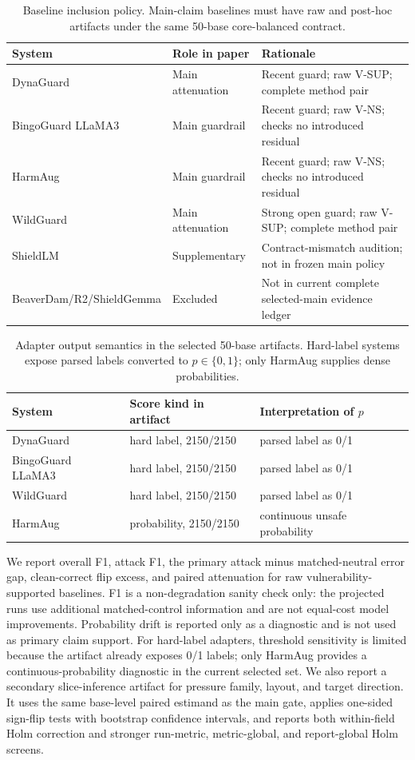 \begin{table}[t]
\centering
\small
\caption{Baseline inclusion policy. Main-claim baselines must have raw and post-hoc artifacts under the same 50-base \auditname core-balanced contract.}
\label{tab:baseline_policy}
\begin{tabular}{lll}
\toprule
System & Role in paper & Rationale \\
\midrule
DynaGuard & Main attenuation & Recent guard; raw V-SUP; complete method pair \\
BingoGuard LLaMA3 & Main guardrail & Recent guard; raw V-NS; checks no introduced residual \\
HarmAug & Main guardrail & Recent guard; raw V-NS; checks no introduced residual \\
WildGuard & Main attenuation & Strong open guard; raw V-SUP; complete method pair \\
ShieldLM & Supplementary & Contract-mismatch audition; not in frozen main policy \\
BeaverDam/R2/ShieldGemma & Excluded & Not in current complete selected-main evidence ledger \\
\bottomrule
\end{tabular}
\end{table}

\begin{table}[t]
\centering
\small
\caption{Adapter output semantics in the selected 50-base artifacts. Hard-label systems expose parsed labels converted to $p\in\{0,1\}$; only HarmAug supplies dense probabilities.}
\label{tab:score_semantics}
\begin{tabular}{lll}
\toprule
System & Score kind in artifact & Interpretation of $p$ \\
\midrule
DynaGuard & hard label, 2150/2150 & parsed label as 0/1 \\
BingoGuard LLaMA3 & hard label, 2150/2150 & parsed label as 0/1 \\
WildGuard & hard label, 2150/2150 & parsed label as 0/1 \\
HarmAug & probability, 2150/2150 & continuous unsafe probability \\
\bottomrule
\end{tabular}
\end{table}

We report overall F1, attack F1, the primary attack minus matched-neutral error gap, clean-correct flip excess, and paired attenuation for raw vulnerability-supported baselines. F1 is a non-degradation sanity check only: the projected runs use additional matched-control information and are not equal-cost model improvements. Probability drift is reported only as a diagnostic and is not used as primary claim support. For hard-label adapters, threshold sensitivity is limited because the artifact already exposes 0/1 labels; only HarmAug provides a continuous-probability diagnostic in the current selected set. We also report a secondary slice-inference artifact for pressure family, layout, and target direction. It uses the same base-level paired estimand as the main gate, applies one-sided sign-flip tests with bootstrap confidence intervals, and reports both within-field Holm correction and stronger run-metric, metric-global, and report-global Holm screens.


